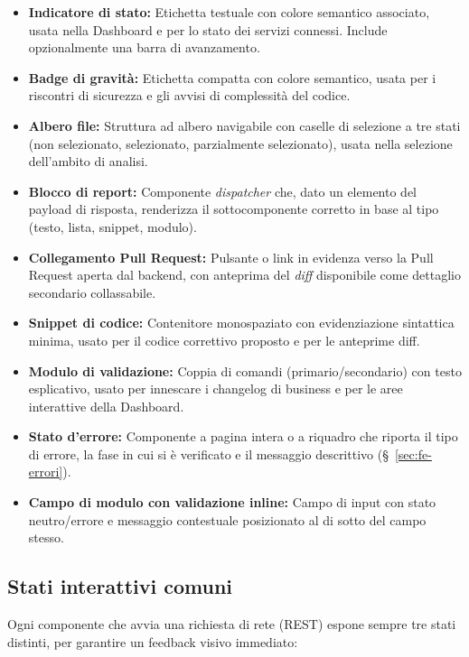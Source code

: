 \documentclass[11pt,a4paper]{article}
\begin{document}
\begin{itemize}
    \item \textbf{Indicatore di stato:} Etichetta testuale con colore semantico associato, usata nella Dashboard e per lo stato dei servizi connessi. Include opzionalmente una barra di avanzamento.
    \item \textbf{Badge di gravità:} Etichetta compatta con colore semantico, usata per i riscontri di sicurezza e gli avvisi di complessità del codice.
    \item \textbf{Albero file:} Struttura ad albero navigabile con caselle di selezione a tre stati (non selezionato, selezionato, parzialmente selezionato), usata nella selezione dell'ambito di analisi.
    \item \textbf{Blocco di report:} Componente \emph{dispatcher} che, dato un elemento del payload di risposta, renderizza il sottocomponente corretto in base al tipo (testo, lista, snippet, modulo).
    \item \textbf{Collegamento Pull Request:} Pulsante o link in evidenza verso la Pull Request aperta dal backend, con anteprima del \emph{diff} disponibile come dettaglio secondario collassabile.
    \item \textbf{Snippet di codice:} Contenitore monospaziato con evidenziazione sintattica minima, usato per il codice correttivo proposto e per le anteprime diff.
    \item \textbf{Modulo di validazione:} Coppia di comandi (primario/secondario) con testo esplicativo, usato per innescare i changelog di business e per le aree interattive della Dashboard.
    \item \textbf{Stato d'errore:} Componente a pagina intera o a riquadro che riporta il tipo di errore, la fase in cui si è verificato e il messaggio descrittivo (\S~\ref{sec:fe-errori}).
    \item \textbf{Campo di modulo con validazione inline:} Campo di input con stato neutro/errore e messaggio contestuale posizionato al di sotto del campo stesso.
\end{itemize}

\subsection{Stati interattivi comuni}

Ogni componente che avvia una richiesta di rete (REST) espone sempre tre stati distinti, per garantire un feedback visivo immediato:
\end{document}
